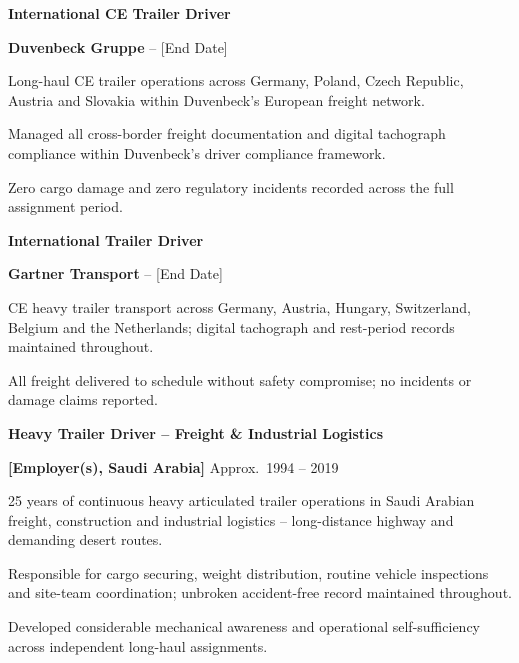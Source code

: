 \documentclass[10pt,a4paper]{article}
\newcommand{\job}[3]{%
  \vspace{2pt}%
  {\color{navy}\fontsize{8.5}{11}\selectfont\bfseries #1}\par
  \vspace{1pt}%
  {\color{dblue}\fontsize{7.5}{9.5}\selectfont\bfseries #2}%
  \hfill
  {\color{accent}\fontsize{7}{9}\selectfont #3}\par
  \vspace{4pt}%
}
\begin{document}
\begin{minipage}[t][297mm][t]{0.682\textwidth}
\begin{minipage}[t]{\textwidth-20pt}
\vspace{2pt}

\job{International CE Trailer Driver}%
    {Duvenbeck Gruppe}{[Start Date] -- [End Date]}
\begin{cvlist}
\item Long-haul CE trailer operations across Germany, Poland,
  Czech Republic, Austria and Slovakia within Duvenbeck's
  European freight network.
\item Managed all cross-border freight documentation and digital
  tachograph compliance within Duvenbeck's driver compliance
  framework.
\item Zero cargo damage and zero regulatory incidents recorded
  across the full assignment period.
\end{cvlist}

\vspace{2pt}

\job{International Trailer Driver}%
    {Gartner Transport}{[Start Date] -- [End Date]}
\begin{cvlist}
\item CE heavy trailer transport across Germany, Austria, Hungary,
  Switzerland, Belgium and the Netherlands; digital tachograph
  and rest-period records maintained throughout.
\item All freight delivered to schedule without safety compromise;
  no incidents or damage claims reported.
\end{cvlist}

\vspace{2pt}

\job{Heavy Trailer Driver -- Freight \& Industrial Logistics}%
    {[Employer(s), Saudi Arabia]}{Approx.\ 1994 -- 2019}
\begin{cvlist}
\item 25 years of continuous heavy articulated trailer operations
  in Saudi Arabian freight, construction and industrial
  logistics -- long-distance highway and demanding desert routes.
\item Responsible for cargo securing, weight distribution, routine
  vehicle inspections and site-team coordination; unbroken
  accident-free record maintained throughout.
\item Developed considerable mechanical awareness and operational
  self-sufficiency across independent long-haul assignments.
\end{cvlist}

\end{minipage}
\end{minipage}
\end{document}
